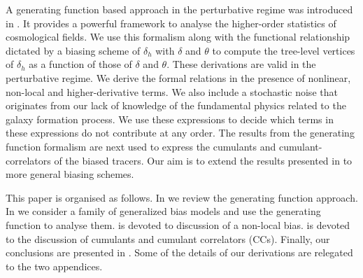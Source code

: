 A generating function based approach in the perturbative regime was introduced in \citep{Ber92}.
It provides a powerful framework to analyse the higher-order statistics of cosmological fields.
We use this formalism along with the
functional relationship dictated by a biasing scheme of $\delta_h$ with $\delta$ and $\theta$ to compute the
tree-level vertices of $\delta_h$ as a function of those of $\delta$ and $\theta$.
These derivations are valid in the perturbative regime.
We derive the formal relations in the presence of nonlinear, non-local and higher-derivative terms.
We also include a stochastic noise that originates from our lack of 
knowledge of the fundamental physics related to the galaxy formation process.
We use these expressions to decide which terms in these expressions
do not contribute at any order. The results from the generating function formalism 
are next used to express the cumulants and cumulant-correlators of the biased tracers.
Our aim is to  extend the results presented in \citep{Munshi_IBIT} to more general biasing schemes. 

This paper is organised as follows. In 
\textsection{\ref{sec:gen}} we review the generating function approach.
In \textsection{\ref{sec:non}} we consider a family of generalized bias models and use the generating function to analyse them.
\textsection{\ref{sec:bias}} is devoted to discussion of a non-local bias.
\textsection{\ref{sec:cumu}} is devoted to the discussion of cumulants and cumulant correlators (CCs).
Finally, our conclusions are presented in \textsection{\ref{sec:conclu}}. Some of the details of our derivations
are relegated to the two appendices.
  